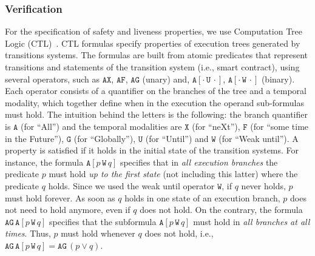 \subsubsection{Verification}
%
For the specification of safety and liveness properties, we use Computation Tree Logic (CTL)~\cite{baier2008principles}. CTL formulas specify properties of execution trees generated by transitions systems. The formulas are built from atomic predicates that represent 
transitions and statements of the
transition system (i.e., smart contract), using several operators, such as $\mathtt{AX}$, $\mathtt{AF}$, $\mathtt{AG}$ (unary) and,
$\mathtt{A}[\cdot\,\mathtt{U}\,\cdot]$,
$\mathtt{A}[\cdot\,\mathtt{W}\,\cdot]$ (binary).  Each operator
consists of a quantifier on the branches of the tree and a temporal modality, which together define when in the execution the operand sub-formulas must hold.  The intuition behind the letters is the
following: the branch quantifier is $\mathtt{A}$ (for ``All'') and the temporal modalities are
$\mathtt{X}$ (for ``neXt''), $\mathtt{F}$ (for ``some time in the
Future''), $\mathtt{G}$ (for ``Globally''), 
$\mathtt{U}$ (for ``Until'') and $\mathtt{W}$ (for ``Weak until'').  
A property is satisfied if it holds in the initial state of the transition systems.  
For instance, the formula
$\mathtt{A}[p\,\mathtt{W}\,q]$ specifies that in \emph{all execution
  branches} the predicate $p$ must hold \emph{up to the first state}
(not including this latter) where the predicate $q$ holds.  
%
Since we used the weak until operator $\mathtt{W}$, if $q$ never
holds, $p$ must hold forever.
%
As soon
as $q$ holds in one state of an execution branch, $p$ does not need to hold
anymore, even if $q$ does not hold.  On the contrary, the formula
$\mathtt{AG}\,\mathtt{A}[p\,\mathtt{W}\,q]$ specifies that the
subformula $\mathtt{A}[p\,\mathtt{W}\,q]$ must hold in \emph{all
  branches at all times}.  Thus, $p$ must hold whenever $q$ does not hold, i.e., $\mathtt{AG}\,\mathtt{A}[p\,\mathtt{W}\,q] = \mathtt{AG}\,(p \lor q)$.

